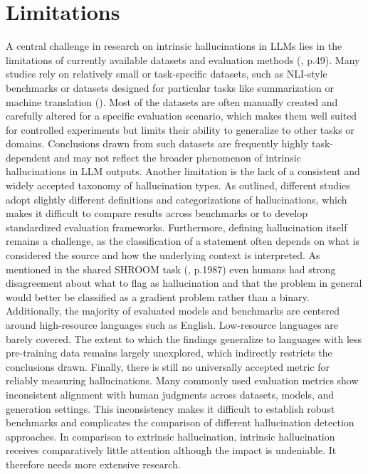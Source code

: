 \documentclass[
  seminar,   	 
  english,   	 
  titlepage=on,
  captions=tableheadings
]{ttlab-qualify}
\begin{document}
\section{Limitations}
A central challenge in research on intrinsic hallucinations in LLMs lies in the limitations of currently available datasets and evaluation methods (\cite{Gu2025LLMJudgeSurvey}, p.49). Many studies rely on relatively small or task-specific datasets, such as NLI-style benchmarks or datasets designed for particular tasks like summarization or machine translation (\cite{Gogoulou2025LLMHallucinationDetection}). Most of the datasets are often manually created and carefully altered for a specific evaluation scenario, which makes them well suited for controlled experiments but limits their ability to generalize to other tasks or domains. Conclusions drawn from such datasets are frequently highly task-dependent and may not reflect the broader phenomenon of intrinsic hallucinations in LLM outputs.
Another limitation is the lack of a consistent and widely accepted taxonomy of hallucination types. As outlined, different studies adopt slightly different definitions and categorizations of hallucinations, which makes it difficult to compare results across benchmarks or to develop standardized evaluation frameworks. Furthermore, defining  hallucination itself remains a challenge, as the classification of a statement often depends on what is considered the source and how the underlying context is interpreted. As mentioned in the shared SHROOM task (\cite{mickus2024shroom}, p.1987) even humans had strong disagreement about what to flag as hallucination and that the problem in general would better be classified as a gradient problem rather than a binary.
Additionally, the majority of evaluated models and benchmarks are centered around high-resource languages such as English. Low-resource languages are barely covered. The extent to which the findings generalize to languages with less pre-training data remains largely unexplored, which indirectly restricts the conclusions drawn.
Finally, there is still no universally accepted metric for reliably measuring hallucinations. Many commonly used evaluation metrics show inconsistent alignment with human judgments across datasets, models, and generation settings. This inconsistency makes it difficult to establish robust benchmarks and complicates the comparison of different hallucination detection approaches. In comparison to extrinsic hallucination, intrinsic hallucination receives comparatively little attention although the impact is undeniable. It therefore needs more extensive research.

\printbibliography
\end{document}
